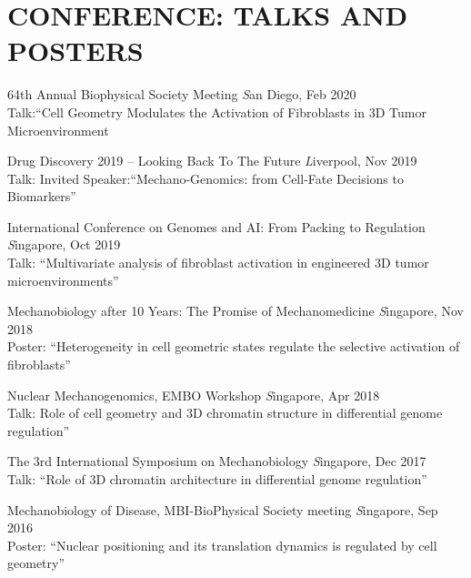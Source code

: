 \documentclass[letterpaper,11pt]{article}
\begin{document}
\section{\bf CONFERENCE: TALKS AND POSTERS}
\begin{etaremune}[itemsep=0pt,parsep=0pt]
    \item 64th Annual Biophysical Society Meeting    \hfill {\emph San Diego, Feb 2020}\\
        \hspace*{3ex}Talk:“Cell Geometry Modulates the Activation of Fibroblasts in 3D Tumor Microenvironment
     \item Drug Discovery 2019 – Looking Back To The Future  \hfill {\emph Liverpool, Nov 2019}\\
        \hspace*{3ex}Talk: Invited Speaker:“Mechano-Genomics: from Cell-Fate Decisions to Biomarkers”
    \item International Conference on Genomes and AI: From Packing to Regulation  \hfill {\emph Singapore, Oct 2019}\\
        \hspace*{3ex}Talk: “Multivariate analysis of fibroblast activation in engineered 3D tumor microenvironments”
    \item Mechanobiology after 10 Years: The Promise of Mechanomedicine \hfill {\emph Singapore, Nov 2018}\\
        \hspace*{3ex}Poster: “Heterogeneity in cell geometric states regulate the selective activation of fibroblasts”
    \item Nuclear Mechanogenomics, EMBO Workshop \hfill {\emph Singapore, Apr 2018}\\
        \hspace*{3ex}Talk: Role of cell geometry and 3D chromatin structure in differential genome regulation”
    \item The 3rd International Symposium on Mechanobiology  \hfill {\emph Singapore, Dec 2017}\\
        \hspace*{3ex}Talk: “Role of 3D chromatin architecture in differential genome regulation”
     \item Mechanobiology of Disease, MBI-BioPhysical Society meeting \hfill {\emph Singapore, Sep 2016}\\
        \hspace*{3ex}Poster: “Nuclear positioning and its translation dynamics is regulated by cell geometry”
\end{etaremune}
\end{document}
